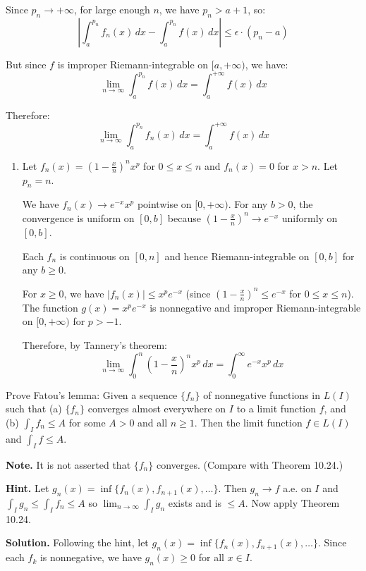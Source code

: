 Since $p_n \to +\infty$, for large enough $n$, we have $p_n > a + 1$, so:
\[|\int_a^{p_n} f_n(x) \, dx - \int_a^{p_n} f(x) \, dx| \leq \epsilon \cdot (p_n - a)\]

But since $f$ is improper Riemann-integrable on $[a,+\infty)$, we have:
\[\lim_{n \to \infty} \int_a^{p_n} f(x) \, dx = \int_a^{+\infty} f(x) \, dx\]

Therefore:
\[\lim_{n \to \infty} \int_a^{p_n} f_n(x) \, dx = \int_a^{+\infty} f(x) \, dx\]

\begin{enumerate}[label=(\alph*),resume]
    \item Let $f_n(x) = (1 - \frac{x}{n})^n x^p$ for $0 \leq x \leq n$ and $f_n(x) = 0$ for $x > n$. Let $p_n = n$.

    We have $f_n(x) \to e^{-x}x^p$ pointwise on $[0,+\infty)$. For any $b > 0$, the convergence is uniform on $[0,b]$ because $(1 - \frac{x}{n})^n \to e^{-x}$ uniformly on $[0,b]$.

    Each $f_n$ is continuous on $[0,n]$ and hence Riemann-integrable on $[0,b]$ for any $b \geq 0$.

    For $x \geq 0$, we have $|f_n(x)| \leq x^p e^{-x}$ (since $(1 - \frac{x}{n})^n \leq e^{-x}$ for $0 \leq x \leq n$). The function $g(x) = x^p e^{-x}$ is nonnegative and improper Riemann-integrable on $[0,+\infty)$ for $p > -1$.

    Therefore, by Tannery's theorem:
    \[\lim_{n \to \infty} \int_{0}^{n} \left( 1 - \frac{x}{n} \right)^n x^p \, dx = \int_{0}^{\infty} e^{-x}x^p \, dx\]
\end{enumerate}

\begin{problembox}
Prove Fatou's lemma: Given a sequence $\{f_n\}$ of nonnegative functions in $L(I)$ such that (a) $\{f_n\}$ converges almost everywhere on $I$ to a limit function $f$, and (b) $\int_I f_n \leq A$ for some $A > 0$ and all $n \geq 1$. Then the limit function $f \in L(I)$ and $\int_I f \leq A$.

\textbf{Note.} It is not asserted that $\{f_n\}$ converges. (Compare with Theorem 10.24.)

\textbf{Hint.} Let $g_n(x) = \inf \{f_n(x), f_{n+1}(x), \ldots\}$. Then $g_n \to f$ a.e. on $I$ and $\int_I g_n \leq \int_I f_n \leq A$ so $\lim_{n \to \infty} \int_I g_n$ exists and is $\leq A$. Now apply Theorem 10.24.
\end{problembox}

\noindent\textbf{Solution.}
Following the hint, let $g_n(x) = \inf \{f_n(x), f_{n+1}(x), \ldots\}$. Since each $f_k$ is nonnegative, we have $g_n(x) \geq 0$ for all $x \in I$.

